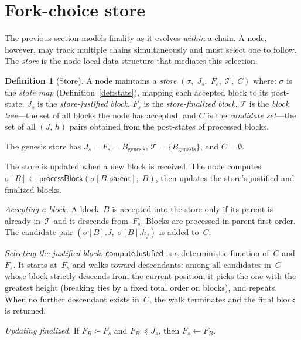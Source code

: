 \documentclass{article}
\newcommand{\parent}{\mathsf{parent}}
\theoremstyle{plain}
\theoremstyle{definition}
\newtheorem{definition}[theorem]{Definition}
\theoremstyle{remark}
\begin{document}
\section{Fork-choice store}

The previous section models finality as it evolves \emph{within} a chain.
A node, however, may track multiple chains simultaneously and must select one to follow.
The \emph{store} is the node-local data structure that mediates this selection.

\begin{definition}[Store]\label{def:store}
A node maintains a \emph{store} $(\sigma,\; J_s,\; F_s,\; \mathcal{T},\; C)$ where:
$\sigma$ is the \emph{state map} (Definition~\ref{def:state}), mapping each accepted block to its post-state,
$J_s$ is the \emph{store-justified block},
$F_s$ is the \emph{store-finalized block},
$\mathcal{T}$ is the \emph{block tree}---the set of all blocks the node has accepted,
and $C$ is the \emph{candidate set}---the set of all $(J,\, h)$ pairs obtained from the post-states of processed blocks.

The genesis store has $J_s = F_s = B_{\mathrm{genesis}}$, $\mathcal{T} = \{B_{\mathrm{genesis}}\}$, and $C = \emptyset$.
\end{definition}

The store is updated when a new block is received.
The node computes $\sigma[B] \gets \textsf{processBlock}(\sigma[B.\parent],\; B)$, then updates the store's justified and finalized blocks.

\emph{Accepting a block.}
A block~$B$ is accepted into the store only if its parent is already in~$\mathcal{T}$ and it descends from~$F_s$.
Blocks are processed in parent-first order.
The candidate pair $(\sigma[B].J,\; \sigma[B].h_j)$ is added to~$C$.

\emph{Selecting the justified block.}
$\textsf{computeJustified}$ is a deterministic function of~$C$ and~$F_s$.
It starts at~$F_s$ and walks toward descendants: among all candidates in~$C$ whose block strictly descends from the current position, it picks the one with the greatest height (breaking ties by a fixed total order on blocks), and repeats.
When no further descendant exists in~$C$, the walk terminates and the final block is returned.

\emph{Updating finalized.}
If $F_B \succ F_s$ and $F_B \preceq J_s$, then $F_s \gets F_B$.
\end{document}
